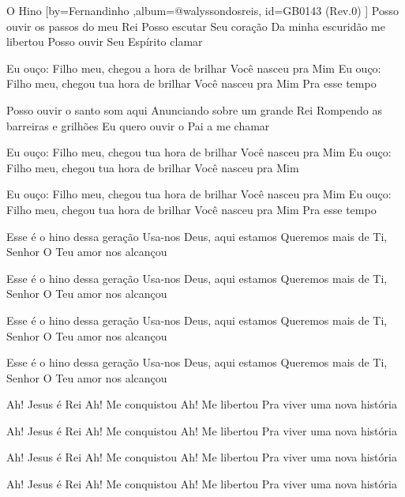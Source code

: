\beginsong
{O Hino %
}[by={Fernandinho %
},album={@walyssondosreis},
id={GB0143 %
(Rev.0) %
}]
Posso ouvir os passos do meu Rei
Posso escutar Seu coração
Da minha escuridão me libertou
Posso ouvir Seu Espírito clamar

Eu ouço: Filho meu, chegou a hora de brilhar
Você nasceu pra Mim
Eu ouço: Filho meu, chegou tua hora de brilhar
Você nasceu pra Mim
Pra esse tempo

Posso ouvir o santo som aqui
Anunciando sobre um grande Rei
Rompendo as barreiras e grilhões
Eu quero ouvir o Pai a me chamar

Eu ouço: Filho meu, chegou tua hora de brilhar
Você nasceu pra Mim
Eu ouço: Filho meu, chegou tua hora de brilhar
Você nasceu pra Mim

Eu ouço: Filho meu, chegou tua hora de brilhar
Você nasceu pra Mim
Eu ouço: Filho meu, chegou tua hora de brilhar
Você nasceu pra Mim
Pra esse tempo

Esse é o hino dessa geração
Usa-nos Deus, aqui estamos
Queremos mais de Ti, Senhor
O Teu amor nos alcançou

Esse é o hino dessa geração
Usa-nos Deus, aqui estamos
Queremos mais de Ti, Senhor
O Teu amor nos alcançou

Esse é o hino dessa geração
Usa-nos Deus, aqui estamos
Queremos mais de Ti, Senhor
O Teu amor nos alcançou

Esse é o hino dessa geração
Usa-nos Deus, aqui estamos
Queremos mais de Ti, Senhor
O Teu amor nos alcançou

Ah! Jesus é Rei
Ah! Me conquistou
Ah! Me libertou
Pra viver uma nova história

Ah! Jesus é Rei
Ah! Me conquistou
Ah! Me libertou
Pra viver uma nova história

Ah! Jesus é Rei
Ah! Me conquistou
Ah! Me libertou
Pra viver uma nova história

Ah! Jesus é Rei
Ah! Me conquistou
Ah! Me libertou
Pra viver uma nova história

